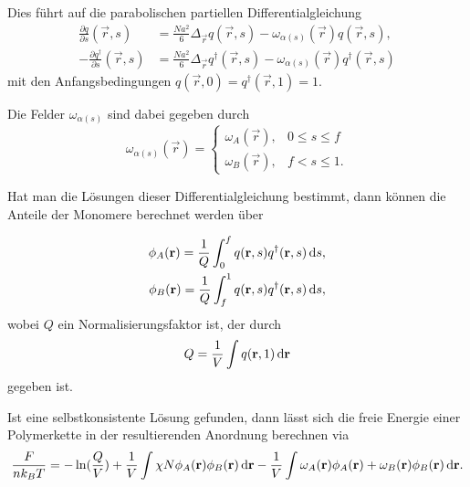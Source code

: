 
Dies führt auf die parabolischen partiellen Differentialgleichung
\begin{equation}
\label{eq:einleitung:mde}
    \begin{aligned}
        \frac{\partial q}{\partial s}(\vec{r}, s) &= \frac{N a^{2}}{6} \Delta_{\vec{r}} q(\vec{r}, s) - \omega_{\alpha(s)}(\vec{r}) q(\vec{r}, s),\\
        -\frac{\partial q^{\dagger}}{\partial s}(\vec{r}, s) &= \frac{N a^{2}}{6} \Delta_{\vec{r}} q^{\dagger}(\vec{r}, s) - \omega_{\alpha(s)}(\vec{r}) q^{\dagger}(\vec{r}, s)
    \end{aligned}
\end{equation}
mit den Anfangsbedingungen $q(\vec{r}, 0) = q^{\dagger}(\vec{r}, 1) = 1$.

Die Felder $\omega_{\alpha(s)}$ sind dabei gegeben durch
\begin{equation}
    \omega_{\alpha(s)}(\vec{r}) = \begin{cases}
        \omega_{A}(\vec{r}), & 0 \leq s \leq f\\
        \omega_{B}(\vec{r}), & f < s \leq 1.
    \end{cases}
\end{equation}

Hat man die Lösungen dieser Differentialgleichung bestimmt, dann können die Anteile der Monomere berechnet werden über

\begin{equation}
    \begin{aligned}
        \phi_{A}(\mathbf{r}) = \frac{1}{Q} \int_{0}^{f} q(\mathbf{r}, s) q^{\dagger}(\mathbf{r}, s) \mathop{}\!\mathrm{d} s,\\
        \phi_{B}(\mathbf{r}) = \frac{1}{Q} \int_{f}^{1} q(\mathbf{r}, s) q^{\dagger}(\mathbf{r}, s) \mathop{}\!\mathrm{d} s,
    \end{aligned}
\end{equation}
wobei $Q$ ein Normalisierungsfaktor ist, der durch
\begin{equation}
    Q = \frac{1}{V} \int q(\mathbf{r}, 1) \mathop{}\!\mathrm{d} \mathbf{r}
\end{equation}
gegeben ist.

Ist eine selbstkonsistente Lösung gefunden, dann lässt sich die freie Energie einer Polymerkette in der resultierenden Anordnung berechnen via
\begin{equation}
\label{eq:einleitung:freie_energie}
    \frac{F}{n k_{B} T} = - \ln(\frac{Q}{V}) + \frac{1}{V} \int \chi N \phi_{A}(\mathbf{r}) \phi_{B}(\mathbf{r}) \mathop{}\!\mathrm{d} \mathbf{r} - \frac{1}{V} \int \omega_{A}(\mathbf{r}) \phi_{A}(\mathbf{r}) + \omega_{B}(\mathbf{r}) \phi_{B}(\mathbf{r}) \mathop{}\!\mathrm{d} \mathbf{r}.
\end{equation}

